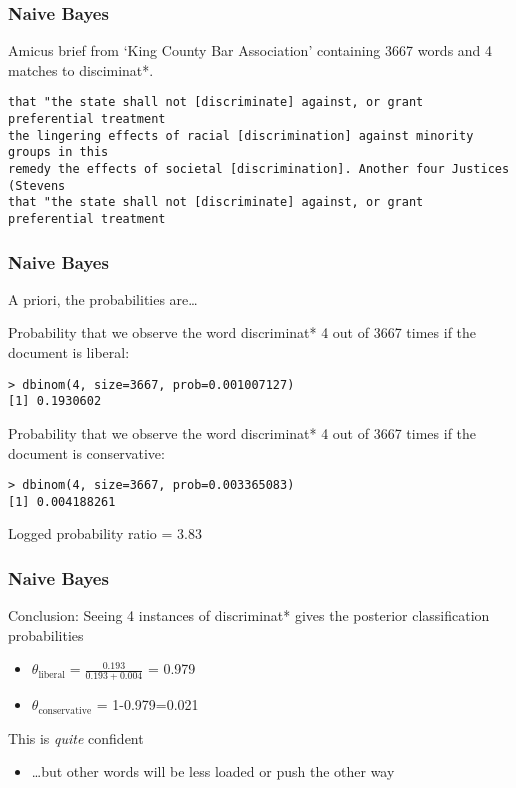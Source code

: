 \documentclass{hertieteaching}
\begin{document}
\begin{frame}[t,fragile]\frametitle{Naive Bayes}

Amicus brief from `King County Bar Association' containing 3667 words and 4 matches to disciminat*.

{\scriptsize
\begin{verbatim}
that "the state shall not [discriminate] against, or grant preferential treatment
the lingering effects of racial [discrimination] against minority groups in this
remedy the effects of societal [discrimination]. Another four Justices (Stevens
that "the state shall not [discriminate] against, or grant preferential treatment
\end{verbatim}
}
\end{frame}


\begin{frame}[t,fragile]\frametitle{Naive Bayes}
A priori, the probabilities are\ldots

Probability that we observe the word  discriminat* 4 out of 3667 times if the document is liberal:
{\small
\begin{verbatim}
> dbinom(4, size=3667, prob=0.001007127)
[1] 0.1930602
\end{verbatim}
}
Probability that we observe the word  discriminat* 4 out of 3667 times if the document is conservative:
{\small
\begin{verbatim}
> dbinom(4, size=3667, prob=0.003365083)
[1] 0.004188261
\end{verbatim}
}
Logged probability ratio = 3.83
\newpage
\end{frame}


\begin{frame}[t,fragile]\frametitle{Naive Bayes}

Conclusion: Seeing 4 instances of discriminat* gives the posterior classification probabilities
\begin{itemize}
\item $\theta_\text{liberal} = \frac{0.193}{0.193+0.004}$ = 0.979
\item $\theta_\text{conservative}$ =  1-0.979=0.021
\end{itemize}

This is \textit{quite} confident
\begin{itemize}
\item \ldots but other words will be less loaded or push the other way
\end{itemize}
\end{frame}
\end{document}
